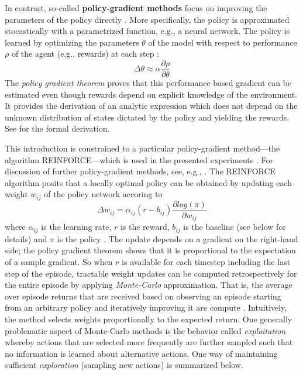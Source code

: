In contrast, so-called \textbf{policy-gradient methods} focus on improving the parameters of the policy directly \parencite{sutton2018reinforcement, sutton1999policy, williams1992simple}. %
More specifically, the policy is approximated stocastically with a parametrized function, e.g., a neural network. The policy is learned by optimizing the parameters $\theta$ of the model with respect to performance $\rho$ of the agent (e.g., rewards) at each step \parencite[][p. 1058]{sutton1999policy}: 
\begin{equation}
\Delta \theta \approx \alpha \frac{\partial \rho}{\partial \theta} 
\end{equation}
The \textit{policy gradient theorem} proves that this performance based gradient can be estimated even though rewards depend on explicit knowledge of the environment. It provides the derivation of an analytic expression which does not depend on the unknown distribution of states dictated by the policy and yielding the rewards. See \cite[][p. 326f.]{sutton2018reinforcement} for the formal derivation.

This introduction is constrained to a particular policy-gradient method---the algorithm REINFORCE---which is used in the presented experiments \parencite{williams1992simple}. For discussion of further policy-gradient methods, see, e.g., \cite{sutton2018reinforcement}. 
The REINFORCE algorithm posits that a locally optimal policy can be obtained by updating each weight $w_{ij}$ of the policy network accoring to 
\begin{equation}
\label{eq:reinforce}
\Delta w_{ij} = \alpha_{ij} (r - b_{ij}) \frac{\partial log(\pi)}{\partial w_{ij}}
\end{equation}
where $\alpha_{ij}$ is the learning rate, $r$ is the reward, $b_{ij}$ is the baseline (see below for details) and $\pi$ is the policy \parencite[cf.][p. 234]{williams1992simple}. The update depends on a gradient on the right-hand side; the policy gradient theorem shows that it is proportional to the expectation of a sample gradient. So when $r$ is available for each timestep including the last step of the episode, tractable weight updates can be computed retrospectively for the entire episode by applying \textit{Monte-Carlo} approximation. That is, the average over episode returns that are received based on observing an episode starting from an arbitrary policy and iteratively improving it are compute \parencite{sutton2018reinforcement}. Intuitively, the method selects weights proportionally to the expected return. One generally problematic aspect of Monte-Carlo methods is the behavior called \textit{exploitation} whereby actions that are selected more frequently are further sampled such that no information is learned about alternative actions. One way of maintaining sufficient \textit{exploration} (sampling new actions) is summarized below. 


